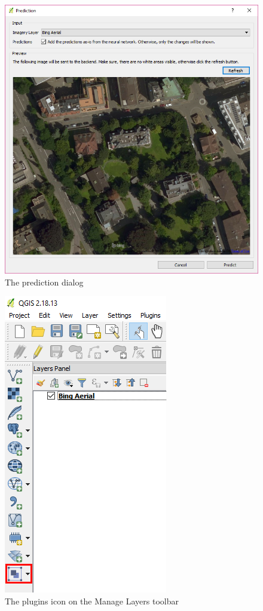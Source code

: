 \begin{figure}[H]
    \centering
	\includegraphics[width=0.8\linewidth]{chapters/introduction/images/prediction_dialog.png}
	\caption{The prediction dialog}
	\label{fig:introduction:prediction_dialog}
\end{figure}

\begin{figure}[H]
    \centering
	\includegraphics[width=0.5\linewidth]{chapters/introduction/images/plugin_icon.png}
	\caption{The plugins icon on the Manage Layers toolbar}
	\label{fig:introduction:plugin_icon}
\end{figure}

